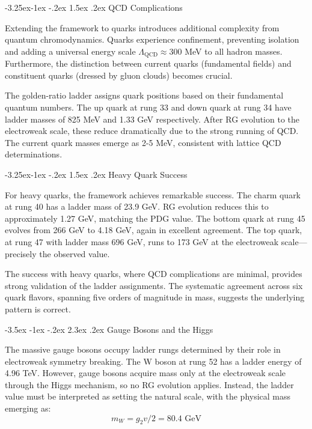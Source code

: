 \documentclass[11pt,a4paper]{article}
\makeatletter
\renewcommand\section{\@startsection{section}{1}{\z@}%
  {-3.5ex \@plus -1ex \@minus -.2ex}%
  {2.3ex \@plus.2ex}%
  {\normalfont\Large\bfseries\color{darkblue}}}
\renewcommand\subsection{\@startsection{subsection}{2}{\z@}%
  {-3.25ex\@plus -1ex \@minus -.2ex}%
  {1.5ex \@plus .2ex}%
  {\normalfont\large\bfseries\color{darkblue}}}
\theoremstyle{definition}
\makeatother
\begin{document}
\subsection{QCD Complications}

Extending the framework to quarks introduces additional complexity from quantum chromodynamics. Quarks experience confinement, preventing isolation and adding a universal energy scale $\Lambda_{\text{QCD}} \approx 300$ MeV to all hadron masses. Furthermore, the distinction between current quarks (fundamental fields) and constituent quarks (dressed by gluon clouds) becomes crucial.

The golden-ratio ladder assigns quark positions based on their fundamental quantum numbers. The up quark at rung 33 and down quark at rung 34 have ladder masses of 825 MeV and 1.33 GeV respectively. After RG evolution to the electroweak scale, these reduce dramatically due to the strong running of QCD. The current quark masses emerge as 2-5 MeV, consistent with lattice QCD determinations.

\subsection{Heavy Quark Success}

For heavy quarks, the framework achieves remarkable success. The charm quark at rung 40 has a ladder mass of 23.9 GeV. RG evolution reduces this to approximately 1.27 GeV, matching the PDG value. The bottom quark at rung 45 evolves from 266 GeV to 4.18 GeV, again in excellent agreement. The top quark, at rung 47 with ladder mass 696 GeV, runs to 173 GeV at the electroweak scale—precisely the observed value.

The success with heavy quarks, where QCD complications are minimal, provides strong validation of the ladder assignments. The systematic agreement across six quark flavors, spanning five orders of magnitude in mass, suggests the underlying pattern is correct.

\section{Gauge Bosons and the Higgs}

The massive gauge bosons occupy ladder rungs determined by their role in electroweak symmetry breaking. The W boson at rung 52 has a ladder energy of 4.96 TeV. However, gauge bosons acquire mass only at the electroweak scale through the Higgs mechanism, so no RG evolution applies. Instead, the ladder value must be interpreted as setting the natural scale, with the physical mass emerging as:
\begin{equation}
m_W = g_2 v/2 = 80.4 \text{ GeV}
\end{equation}
\end{document}
